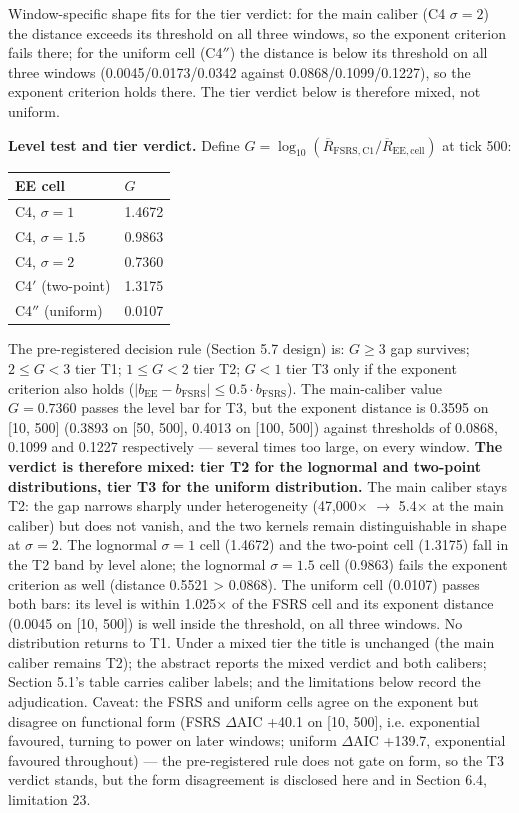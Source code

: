 \documentclass[11pt]{article}
\begin{document}
Window-specific shape fits for the tier verdict: for the main caliber (C4 $\sigma=2$) the distance exceeds its threshold on all three windows, so the exponent criterion fails there; for the uniform cell (C4$''$) the distance is below its threshold on all three windows (0.0045/0.0173/0.0342 against 0.0868/0.1099/0.1227), so the exponent criterion holds there. The tier verdict below is therefore mixed, not uniform.

\textbf{Level test and tier verdict.} Define $G = \log_{10}(\overline{R}_{\mathrm{FSRS,C1}} / \overline{R}_{\mathrm{EE,cell}})$ at tick 500:

\begin{table}[htbp]
\centering
\begin{tabular}{ll}
\toprule
\textbf{EE cell} & \textbf{$G$} \\
\midrule
C4, $\sigma=1$ & 1.4672 \\
C4, $\sigma=1.5$ & 0.9863 \\
C4, $\sigma=2$ & 0.7360 \\
C4$'$ (two-point) & 1.3175 \\
C4$''$ (uniform) & 0.0107 \\
\bottomrule
\end{tabular}
\end{table}

The pre-registered decision rule (Section 5.7 design) is: $G \geq 3$ gap survives; $2 \leq G < 3$ tier T1; $1 \leq G < 2$ tier T2; $G < 1$ tier T3 only if the exponent criterion also holds ($|b_{\mathrm{EE}} - b_{\mathrm{FSRS}}| \leq 0.5 \cdot b_{\mathrm{FSRS}}$). The main-caliber value $G = 0.7360$ passes the level bar for T3, but the exponent distance is 0.3595 on [10, 500] (0.3893 on [50, 500], 0.4013 on [100, 500]) against thresholds of 0.0868, 0.1099 and 0.1227 respectively --- several times too large, on every window. \textbf{The verdict is therefore mixed: tier T2 for the lognormal and two-point distributions, tier T3 for the uniform distribution.} The main caliber stays T2: the gap narrows sharply under heterogeneity (47,000$\times$ $\rightarrow$ 5.4$\times$ at the main caliber) but does not vanish, and the two kernels remain distinguishable in shape at $\sigma=2$. The lognormal $\sigma=1$ cell (1.4672) and the two-point cell (1.3175) fall in the T2 band by level alone; the lognormal $\sigma=1.5$ cell (0.9863) fails the exponent criterion as well (distance 0.5521 > 0.0868). The uniform cell (0.0107) passes both bars: its level is within 1.025$\times$ of the FSRS cell and its exponent distance (0.0045 on [10, 500]) is well inside the threshold, on all three windows. No distribution returns to T1. Under a mixed tier the title is unchanged (the main caliber remains T2); the abstract reports the mixed verdict and both calibers; Section 5.1's table carries caliber labels; and the limitations below record the adjudication. Caveat: the FSRS and uniform cells agree on the exponent but disagree on functional form (FSRS $\Delta$AIC +40.1 on [10, 500], i.e. exponential favoured, turning to power on later windows; uniform $\Delta$AIC +139.7, exponential favoured throughout) --- the pre-registered rule does not gate on form, so the T3 verdict stands, but the form disagreement is disclosed here and in Section 6.4, limitation 23.
\end{document}
